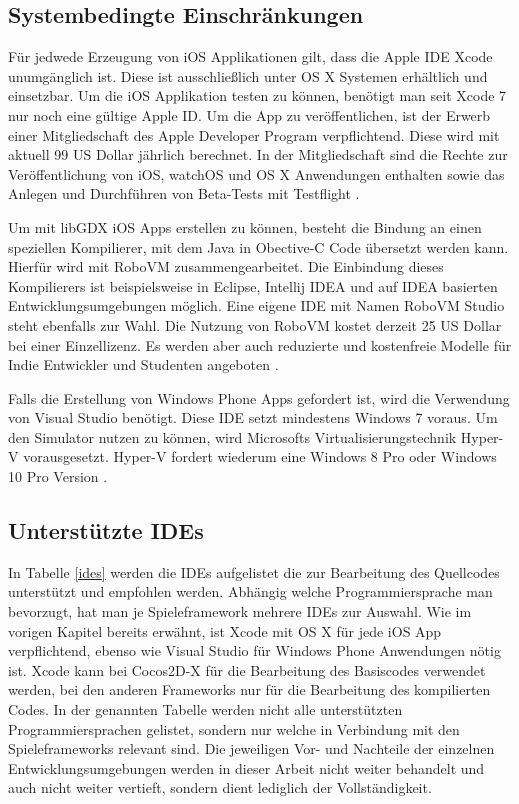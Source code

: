 \subsection{Systembedingte Einschränkungen}
Für jedwede Erzeugung von iOS Applikationen gilt, dass die Apple IDE Xcode unumgänglich ist. Diese ist ausschließlich unter OS X Systemen erhältlich und einsetzbar. Um die iOS Applikation testen zu können, benötigt man seit Xcode 7 nur noch eine gültige Apple ID. Um die App zu veröffentlichen, ist der Erwerb einer Mitgliedschaft des Apple Developer Program verpflichtend. Diese wird mit aktuell 99 US Dollar jährlich berechnet. In der Mitgliedschaft sind die Rechte zur Veröffentlichung von iOS, watchOS und OS X Anwendungen enthalten sowie das Anlegen und Durchführen von Beta-Tests mit Testflight \citep{apple_developer_program}.

\bigskip
Um mit libGDX iOS Apps erstellen zu können, besteht die Bindung an einen speziellen Kompilierer, mit dem Java in Obective-C Code übersetzt werden kann. Hierfür wird mit RoboVM zusammengearbeitet. Die Einbindung dieses Kompilierers ist beispielsweise in Eclipse, Intellij IDEA und auf IDEA basierten Entwicklungsumgebungen möglich. Eine eigene IDE mit Namen RoboVM Studio steht ebenfalls zur Wahl. Die Nutzung von RoboVM kostet derzeit 25 US Dollar bei einer Einzellizenz. Es werden aber auch reduzierte und kostenfreie Modelle für Indie Entwickler und Studenten angeboten \citep{roboVM}. 

\bigskip
Falls die Erstellung von Windows Phone Apps gefordert ist, wird die Verwendung von Visual Studio benötigt. Diese IDE setzt mindestens Windows 7 voraus. Um den Simulator nutzen zu können, wird Microsofts Virtualisierungstechnik Hyper-V vorausgesetzt. Hyper-V fordert wiederum  eine Windows 8 Pro oder Windows 10 Pro Version \citep{visual_studio}. 

\subsection{Unterstützte IDEs}
In Tabelle \ref{ides} werden die IDEs aufgelistet die zur Bearbeitung des Quellcodes unterstützt und empfohlen werden. Abhängig welche Programmiersprache man bevorzugt, hat man je Spieleframework mehrere IDEs zur Auswahl. Wie im vorigen Kapitel bereits erwähnt, ist Xcode mit OS X für jede iOS App verpflichtend, ebenso wie Visual Studio für Windows Phone Anwendungen nötig ist. Xcode kann bei Cocos2D-X für die Bearbeitung des Basiscodes verwendet werden, bei den anderen Frameworks nur für die Bearbeitung des kompilierten Codes. In der genannten Tabelle werden nicht alle unterstützten Programmiersprachen gelistet, sondern nur welche in Verbindung mit den Spieleframeworks relevant sind. Die jeweiligen Vor- und Nachteile der einzelnen Entwicklungsumgebungen werden in dieser Arbeit nicht weiter behandelt und auch nicht weiter vertieft, sondern dient lediglich der Vollständigkeit.

